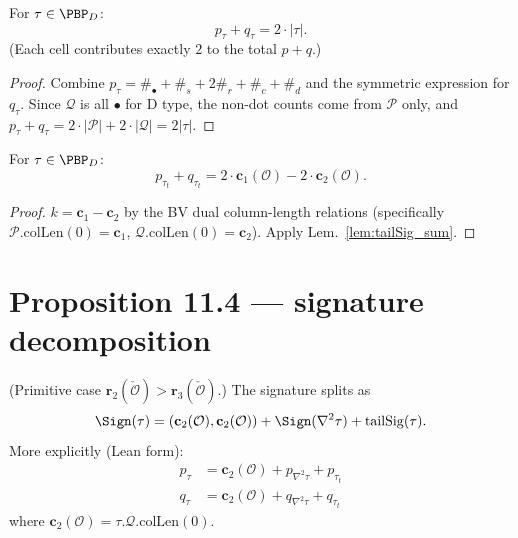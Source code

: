 \begin{lemma}
  \label{lem:sig_sum_D}
  \leanok
  For $\tau \in \PBP_D$:
  \[ p_\tau + q_\tau = 2\cdot|\tau|. \]
  (Each cell contributes exactly $2$ to the total $p + q$.)
\end{lemma}
\begin{proof}
  \leanok
  Combine $p_\tau = \#_\bullet + \#_s + 2\#_r + \#_c + \#_d$ and the symmetric expression for $q_\tau$. Since $\mathcal{Q}$ is all $\bullet$ for D type, the non-dot counts come from $\mathcal{P}$ only, and $p_\tau + q_\tau = 2 \cdot |\mathcal{P}| + 2 \cdot |\mathcal{Q}| = 2|\tau|$.
\end{proof}

\begin{lemma}
  \label{lem:residual_D}
  \leanok
  For $\tau \in \PBP_D$:
  \[ p_{\tau_t} + q_{\tau_t} = 2 \cdot \mathbf{c}_1(\mathcal{O}) - 2 \cdot \mathbf{c}_2(\mathcal{O}). \]
\end{lemma}
\begin{proof}
  \leanok
  $k = \mathbf{c}_1 - \mathbf{c}_2$ by the BV dual column-length relations (specifically $\mathcal{P}.\mathrm{colLen}(0) = \mathbf{c}_1$, $\mathcal{Q}.\mathrm{colLen}(0) = \mathbf{c}_2$). Apply Lem.~\ref{lem:tailSig_sum}.
\end{proof}

\section{Proposition 11.4 — signature decomposition}

\begin{proposition}
  \label{prop:11_4}
  \leanok
  (Primitive case $\mathbf{r}_2(\check{\mathcal{O}}) > \mathbf{r}_3(\check{\mathcal{O}})$.) The signature splits as
  \[ \Sign(\tau) = (\mathbf{c}_2(\mathcal{O}), \mathbf{c}_2(\mathcal{O})) + \Sign(\nabla^2\tau) + \mathrm{tailSig}(\tau). \]
  More explicitly (Lean form):
  \begin{align*}
    p_\tau &= \mathbf{c}_2(\mathcal{O}) + p_{\nabla^2\tau} + p_{\tau_t} \\
    q_\tau &= \mathbf{c}_2(\mathcal{O}) + q_{\nabla^2\tau} + q_{\tau_t}
  \end{align*}
  where $\mathbf{c}_2(\mathcal{O}) = \tau.\mathcal{Q}.\mathrm{colLen}(0)$.
\end{proposition}

